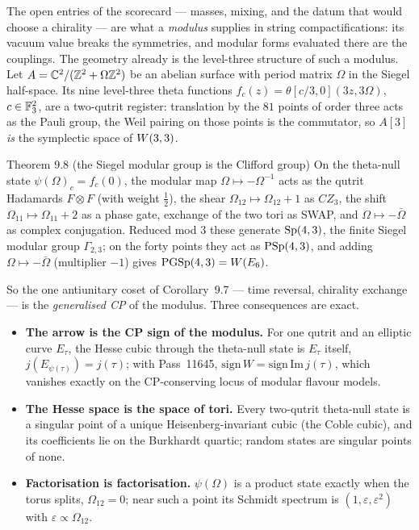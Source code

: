 The open entries of the scorecard --- masses, mixing, and the datum that would choose a chirality --- are what a
\emph{modulus} supplies in string compactifications: its vacuum value breaks the symmetries, and modular forms
evaluated there are the couplings. The geometry already is the level-three structure of such a modulus.
Let $A=\mathbb{C}^2/(\mathbb{Z}^2+\Omega\mathbb{Z}^2)$ be an abelian surface with period matrix $\Omega$ in the Siegel half-space. Its nine
level-three theta functions $f_c(z)=\theta[c/3,0](3z,3\Omega)$, $c\in\mathbb{F}_3^2$, are a two-qutrit register: translation
by the $81$ points of order three acts as the Pauli group, the Weil pairing on those points is the commutator, so
$A[3]$ \emph{is} the symplectic space of $W(3,3)$.

\begin{result}{Theorem 9.8 (the Siegel modular group is the Clifford group) \hfill \tierC}
On the theta-null state $\psi(\Omega)_c=f_c(0)$, the modular map $\Omega\mapsto-\Omega^{-1}$ acts as the qutrit
Hadamards $F\otimes F$ (with weight $\tfrac12$), the shear $\Omega_{12}\mapsto\Omega_{12}+1$ as $CZ_3$, the shift
$\Omega_{11}\mapsto\Omega_{11}+2$ as a phase gate, exchange of the two tori as SWAP, and $\Omega\mapsto-\bar\Omega$ as
complex conjugation. Reduced mod $3$ these generate $\mathrm{Sp}(4,3)$, the finite Siegel modular group
$\Gamma_{2,3}$; on the forty points they act as $\mathrm{PSp}(4,3)$, and adding $\Omega\mapsto-\bar\Omega$ (multiplier $-1$)
gives $\mathrm{PGSp}(4,3)=W(E_6)$. 
\end{result}

So the one antiunitary coset of Corollary~9.7 --- time reversal, chirality exchange --- is the \emph{generalised CP} of
the modulus. Three consequences are exact.
\begin{itemize}
\item \textbf{The arrow is the CP sign of the modulus.} For one qutrit and an elliptic curve $E_\tau$, the Hesse
  cubic through the theta-null state is $E_\tau$ itself, $j(E_{\psi(\tau)})=j(\tau)$; with Pass~11645,
  $\mathrm{sign}\,W=\mathrm{sign}\,\mathrm{Im}\,j(\tau)$, which vanishes exactly on the CP-conserving locus of modular
  flavour models.
\item \textbf{The Hesse space is the space of tori.} Every two-qutrit theta-null state is a singular point of a unique
  Heisenberg-invariant cubic (the Coble cubic), and its coefficients lie on the Burkhardt quartic; random states are
  singular points of none.
\item \textbf{Factorisation is factorisation.} $\psi(\Omega)$ is a product state exactly when the torus splits,
  $\Omega_{12}=0$; near such a point its Schmidt spectrum is $(1,\varepsilon,\varepsilon^2)$ with
  $\varepsilon\propto\Omega_{12}$.
\end{itemize}


